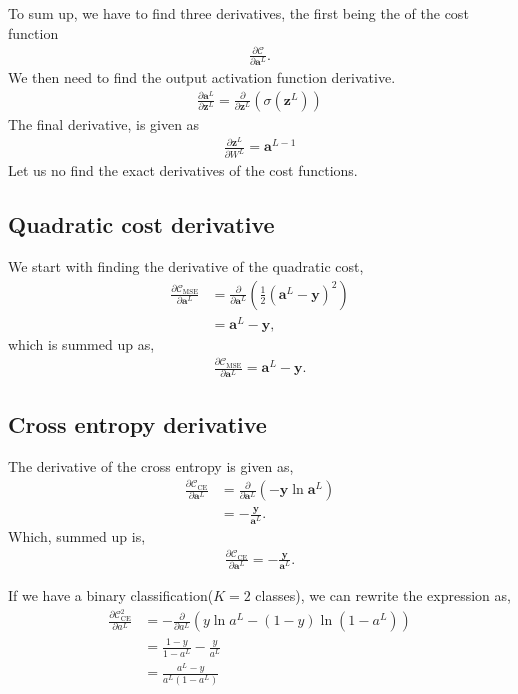 \documentclass[a4paper,10pt]{article}
\newcommand{\pd}[2]{\frac{\partial {#1}}{\partial {#2}}}
\begin{document}
To sum up, we have to find three derivatives, the first being the of the cost function
\begin{align*}
    \pd{\mathcal{C}}{\bm{a}^L}.
\end{align*}
We then need to find the output activation function derivative.
\begin{align}
    \pd{\bm{a}^L}{\bm{z}^L} = \pd{}{\bm{z}^L} \left(\sigma(\bm{z}^L)\right)
    \label{eq:output-activation-function-derivative}
\end{align}
The final derivative, is given as
\begin{align}
    \pd{\bm{z}^L}{W^L} = \bm{a}^{L-1}
    \label{eq:z-derivative}
\end{align}
Let us no find the exact derivatives of the cost functions.

\subsection{Quadratic cost derivative}
We start with finding the derivative of the quadratic cost,
\begin{align*}
    \pd{\mathcal{C}_\mathrm{MSE}}{\bm{a}^L} &= \pd{}{\bm{a}^L}\left( \frac{1}{2}(\bm{a}^L - \bm{y})^2 \right) \\
    &= \bm{a}^L - \bm{y},
\end{align*}
which is summed up as,
\begin{align}
    \pd{\mathcal{C}_\mathrm{MSE}}{\bm{a}^L} = \bm{a}^L - \bm{y}.
    \label{eq:mse-derivative}
\end{align}

\subsection{Cross entropy derivative}
The derivative of the cross entropy is given as,
\begin{align*}
    \pd{\mathcal{C}_\mathrm{CE}}{\bm{a}^L} &= \pd{}{\bm{a}^L}\left( - \bm{y} \ln \bm{a}^L \right) \\
    &= - \frac{\bm{y}}{\bm{a}^L}.
\end{align*}
Which, summed up is,
\begin{align}
    \pd{\mathcal{C}_\mathrm{CE}}{\bm{a}^L} = - \frac{\bm{y}}{\bm{a}^L}.
    \label{eq:cross-entropy-derivative}
\end{align}

If we have a binary classification($K=2$ classes), we can rewrite the expression as,
\begin{align*}
    \pd{\mathcal{C}^2_\mathrm{CE}}{a^L} &= - \pd{}{a^L} \left( y \ln a^L - (1 - y) \ln (1 - a^L) \right) \\
    &= \frac{1-y}{1-a^L} - \frac{y}{a^L} \\
    &= \frac{a^L - y}{a^L(1 - a^L)}
\end{align*}
\end{document}
